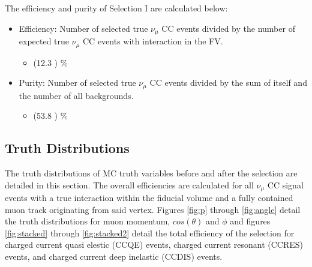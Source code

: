 The efficiency and purity of Selection I are calculated below:
\begin{itemize}
\item Efficiency: Number of selected true $\nu_{\mu}$ CC events divided by the number of expected true $\nu_{\mu}$ CC events with interaction in the FV.
	\begin{itemize}
	\item (12.3 ) \%
	\end{itemize}
\item Purity: Number of selected true $\nu_{\mu}$ CC events divided by the sum of itself and the number of all backgrounds.
	\begin{itemize}
	\item (53.8 ) \%
	\end{itemize}
\end{itemize}
\subsection{Truth Distributions}
The truth distributions of MC truth variables before and after the selection are detailed in this section. The overall efficiencies are calculated for all $\nu_{\mu}$ CC signal events with a true interaction within the fiducial volume and a fully contained muon track originating from said vertex. Figures \ref{fig:p} through \ref{fig:angle} detail the truth distributions for muon momentum, $cos(\theta)$ and $\phi$ and figures \ref{fig:stacked} through \ref{fig:stacked2} detail the total efficiency of the selection for charged current quasi elestic (CCQE) events, charged current resonant (CCRES) events, and charged current deep inelastic (CCDIS) events. 

